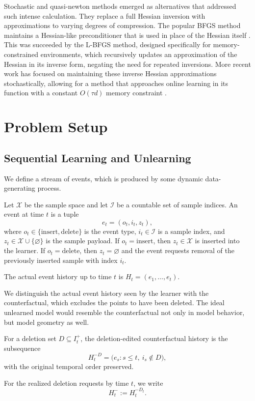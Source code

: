 \documentclass{ssl}
\begin{document}
Stochastic and quasi-newton methods emerged as alternatives that addressed such intense calculation. They replace a full Hessian inversion with approximations to varying degrees of compression. The popular BFGS method maintains a Hessian-like preconditioner that is used in place of the Hessian itself \cite{byrd_limited_1995}. This was succeeded by the L-BFGS method, designed specifically for memory-constrained environments, which recursively updates an approximation of the Hessian in its inverse form, negating the need for repeated inversions. More recent work has focused on maintaining these inverse Hessian approximations stochastically, allowing for a method that approaches online learning in its function with a constant $O(\tau d)$ memory constraint \cite{qiao_hessian-free_2025}.

\section{Problem Setup}
\subsection{Sequential Learning and Unlearning}
We define a stream of events, which is produced by some dynamic data-generating process.

\begin{definition}
Let $\mathcal X$ be the sample space and let $\mathcal I$ be a countable set of sample indices. An event at time $t$ is a tuple
$$
    e_t = (o_t,i_t,z_t),
$$
where $o_t \in \{\mathrm{insert},\mathrm{delete}\}$ is the event type, $i_t \in \mathcal I$ is a sample index, and $z_t \in \mathcal X \cup \{\varnothing\}$ is the sample payload. If $o_t=\mathrm{insert}$, then $z_t\in\mathcal X$ is inserted into the learner. If $o_t=\mathrm{delete}$, then $z_t=\varnothing$ and the event requests removal of the previously inserted sample with index $i_t$.

The actual event history up to time $t$ is $H_t = (e_1,\ldots,e_t).$
\end{definition}

We distinguish the actual event history seen by the learner with the counterfactual, which excludes the points to have been deleted. The ideal unlearned model would resemble the counterfactual not only in model behavior, but model geometry as well.

\begin{definition}
For a deletion set $D\subseteq I_t^{+}$, the deletion-edited counterfactual
history is the subsequence
$$
    H_t^{-D}
    =
    \bigl(e_s : s\le t,\ i_s\notin D\bigr),
$$
with the original temporal order preserved.

For the realized deletion requests by time $t$, we write
$$
    H_t^{-} := H_t^{-D_t}.
$$
\end{definition}
\end{document}
